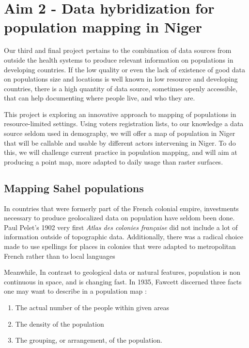 \section[Data hybridization]{Aim 2 - Data hybridization for population mapping in Niger}

Our third and final project pertains to the combination of data sources from outside the health systems to produce relevant information on populations in developing countries. If the low quality or even the lack of existence of good data on populations size and locations is well known in low resource and developing countries, there is a high quantity of data source, sometimes openly accessible, that can help documenting where people live, and who they are.

This  project is exploring an innovative approach to mapping of populations in resource-limited settings. Using voters registration lists, to our knowledge a data source seldom used in demography, we will offer a map of population in Niger that will be callable and usable by different actors intervening in Niger. To do this, we will challenge current practice in population mapping, and will aim at producing a point map, more adapted to daily usage than raster surfaces.

\subsection{Mapping Sahel populations}

In countries that were formerly part of the French colonial empire, investments necessary to produce geolocalized data on population have seldom been done. Paul Pelet's 1902 very first \textit{Atlas des colonies française} did not include a lot of
information outside of topographic data\cite{zimmermann_atlas_1903}. Additionally, there was a radical choice made to use spellings for places in colonies that were adapted to metropolitan French rather than to local languages\cite{zimmermann_atlas_1903}

Meanwhile, In contrast to geological data or natural features, population is non continuous in space, and is changing fast. In 1935, Fawcett discerned three facts one may want to describe in a population map \cite{fawcett_population_1935}:
\begin{enumerate}
	\item The actual number of the people within given areas
	\item The density of the population
	\item The grouping, or arrangement, of the population.
\end{enumerate}

